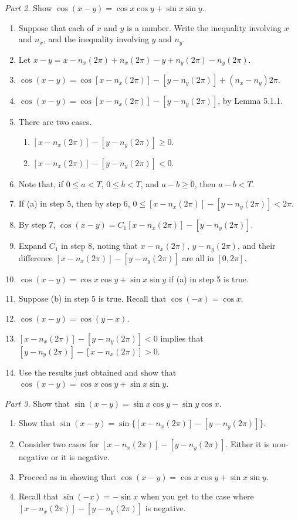 \documentclass[english]{book}
\begin{document}
\emph{Part 2.} Show $\cos(x-y) = \cos x\cos y + \sin x\sin y$.
\begin{enumerate}[\hspace{1cm}1)]
  \item Suppose that each of $x$ and $y$ is a number. Write the inequality involving $x$ and $n_{x}$, and the inequality involving $y$ and $n_{y}$. 
  \item Let $x-y = x-n_{x}(2\pi) + n_{x}(2\pi)-y + n_{y}(2\pi)-n_{y}(2\pi)$.
  \item $\cos(x-y) = \cos{[x-n_{x}(2\pi)] - [y-n_{y}(2\pi)] + (n_{x}-n_{y})2\pi}$.
  \item $\cos(x-y) = \cos{[x-n_{x}(2\pi)] - [y-n_{y}(2\pi)]}$, by Lemma 5.1.1.
  \item There are two cases.
    \begin{enumerate}
      \item $[x-n_{x}(2\pi)] - [y-n_{y}(2\pi)] \geq 0$.
      \item $[x-n_{x}(2\pi)] - [y-n_{y}(2\pi)] < 0$.
    \end{enumerate}
  \item Note that, if $0 \leq a < T$, $0 \leq b < T$, and $a-b \geq 0$, then $a-b < T$.
  \item If (a) in step 5, then by step 6, $0 \leq [x-n_{x}(2\pi)] - [y-n_{y}(2\pi)] < 2\pi$.
  \item By step 7, $\cos(x-y) = C_{1}{[x-n_{x}(2\pi)] - [y-n_{y}(2\pi)]}$.
  \item Expand $C_{1}$ in step 8, noting that $x-n_{x}(2\pi)$, $y-n_{y}(2\pi)$, and their difference $[x-n_{x}(2\pi)] - [y-n_{y}(2\pi)]$ are all in $[0,2\pi]$.
  \item $\cos(x-y) = \cos x\cos y + \sin x\sin y$ if (a) in step 5 is true.
  \item Suppose (b) in step 5 is true. Recall that $\cos(-x) = \cos x$.
  \item $\cos(x-y) = \cos(y-x)$.
  \item $[x-n_{x}(2\pi)] - [y-n_{y}(2\pi)] < 0$ implies that $[y-n_{y}(2\pi)] - [x-n_{x}(2\pi)] > 0$.
  \item Use the results just obtained and show that $\cos(x-y) = \cos x\cos y + \sin x\sin y$.
\end{enumerate}

\emph{Part 3.} Show that $\sin(x-y) = \sin x\cos y - \sin y\cos x$.
\begin{enumerate}[\hspace{1cm}1)]
  \item Show that $\sin(x-y) = \sin \{ [x-n_{x}(2\pi)]-[y-n_{y}(2\pi)] \}$.
  \item Consider two cases for $[x-n_{x}(2\pi)] - [y-n_{y}(2\pi)]$. Either it is non-negative or it is negative.
  \item Proceed as in showing that $\cos(x-y) = \cos x\cos y + \sin x\sin y$.
  \item Recall that $\sin(-x) = -\sin x$ when you get to the case where $[x-n_{x}(2\pi)] - [y-n_{y}(2\pi)]$ is negative.
\end{enumerate}
\end{document}
